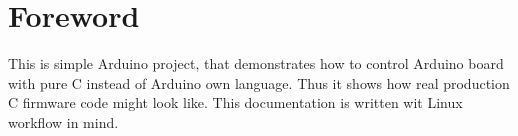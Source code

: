 
\section{Foreword}

This is simple Arduino project, that demonstrates how to control Arduino board with pure C instead of Arduino own language. Thus it shows how real production C firmware code might look like. This documentation is written wit Linux workflow in mind.